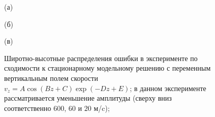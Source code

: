 \documentclass[14pt, a4paper]{extarticle}
\begin{document}
\begin{figure}[H]

(а) 

\end{figure}

\begin{figure}[H]

(б)

\end{figure}

\begin{figure}[H]

(в)

\caption{Широтно-высотные распределения ошибки в эксперименте по сходимости к стационарному модельному решению с переменным вертикальным полем скорости $v_z = A\cos(Bz+C)\exp(-Dz+E)$; в данном эксперименте рассматривается уменьшение амплитуды (сверху вниз соответственно $600$, $60$ и $20$ м/c); }
\end{figure}
\end{document}
